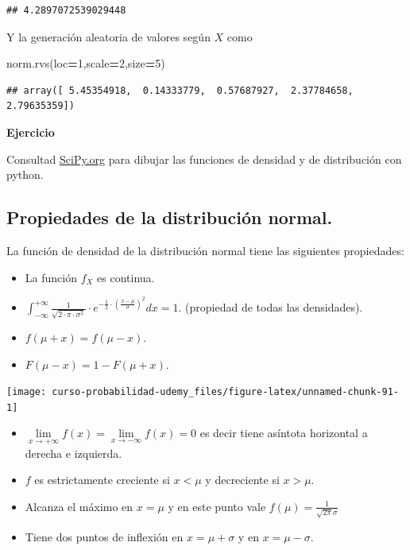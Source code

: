 \documentclass[]{book}
\newenvironment{Shaded}{\begin{snugshade}}{\end{snugshade}}
\newcommand{\DecValTok}[1]{\textcolor[rgb]{0.00,0.00,0.81}{#1}}
\newcommand{\NormalTok}[1]{#1}
\newcommand{\OperatorTok}[1]{\textcolor[rgb]{0.81,0.36,0.00}{\textbf{#1}}}
\providecommand{\tightlist}{%
  \setlength{\itemsep}{0pt}\setlength{\parskip}{0pt}}
\begin{document}
\begin{verbatim}
## 4.2897072539029448
\end{verbatim}

Y la generación aleatoria de valores según \(X\) como

\begin{Shaded}
\begin{Highlighting}[]
\NormalTok{norm.rvs(loc}\OperatorTok{=}\DecValTok{1}\NormalTok{,scale}\OperatorTok{=}\DecValTok{2}\NormalTok{,size}\OperatorTok{=}\DecValTok{5}\NormalTok{)}
\end{Highlighting}
\end{Shaded}

\begin{verbatim}
## array([ 5.45354918,  0.14333779,  0.57687927,  2.37784658,  2.79635359])
\end{verbatim}

\textbf{Ejercicio}

Consultad \href{https://docs.scipy.org/doc/scipy/reference/generated/scipy.stats.norm.html}{SciPy.org} para dibujar las funciones de densidad y de distribución con python.

\hypertarget{propiedades-de-la-distribuciuxf3n-normal.}{%
\subsection{Propiedades de la distribución normal.}\label{propiedades-de-la-distribuciuxf3n-normal.}}

La función de densidad de la
distribución normal tiene las siguientes propiedades:

\begin{itemize}
\tightlist
\item
  La función \(f_X\) es continua.
\item
  \(\int_{-\infty}^{+\infty} \frac{1}{\sqrt{2\cdot\pi\cdot \sigma^2}}\cdot e^{-\frac{1}{2}\cdot \left(\frac{x-\mu}{\sigma}\right)^2} dx =1.\) (propiedad de todas las densidades).
\item
  \(f(\mu+x)=f(\mu-x)\).
\item
  \(F(\mu-x)=1-F(\mu+x)\).
\end{itemize}

\begin{center}\texttt{[image: curso-probabilidad-udemy\_files/figure-latex/unnamed-chunk-91-1]} \end{center}

\begin{itemize}
\tightlist
\item
  \(\lim\limits_{x\to+\infty}f(x)=\lim\limits_{x\to-\infty}f(x)=0\) es decir tiene asíntota horizontal a derecha e izquierda.
\item
  \(f\) es estrictamente creciente si \(x<\mu\) y decreciente si \(x>\mu\).
\item
  Alcanza el máximo en \(x=\mu\) y en este punto vale \(f(\mu)=\frac1{\sqrt{2\pi}\sigma}\)
\item
  Tiene dos puntos de inflexión en \(x=\mu+\sigma\) y en \(x=\mu-\sigma\).
\end{itemize}
\end{document}
